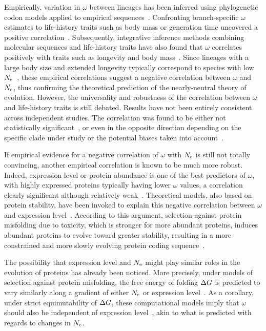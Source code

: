 Empirically, variation in $\omega$ between lineages has been inferred using phylogenetic {codon} models applied to empirical sequences~\citep{Yang1998,Zhang2004}.
Confronting branch-specific $\omega$ estimates to life-history traits such as body mass or generation time uncovered a positive correlation~\citep{Popadin2007, Nikolaev2007}.
Subsequently, integrative inference methods combining molecular sequences and life-history traits have also found that $\omega$ correlates positively with traits such as longevity and body mass~\citep{Lartillot2011, Figuet2017}.
Since lineages with a large body size and extended longevity typically correspond to species with low $N_{\text{e}}$~\citep{Romiguier2014}, these empirical correlations suggest a negative correlation between $\omega$ and $N_{\text{e}}$, thus confirming the theoretical prediction of the {nearly-neutral} theory of evolution.
However, the universality and robustness of the correlation between $\omega$ and life-history traits is still debated.
Results have not been entirely consistent across independent studies. The correlation was found to be either not statistically significant~\citep{Lartillot2012}, or even in the opposite direction depending on the specific clade under study or the potential biases taken into account~\citep{Lanfear2010, Nabholz2013, Lanfear2014, Figuet2016}.

If empirical evidence for a negative correlation of $\omega$ with $N_{\text{e}}$ is still not totally convincing, another empirical correlation is known to be much more robust.
Indeed, expression level or protein abundance is one of the best predictors of $\omega$, with highly expressed proteins typically having lower $\omega$ values, a correlation clearly significant although relatively weak~\citep{Duret2000, Rocha2004, Drummond2005a, Zhang2015, Song2017}.
Theoretical models, also based on protein stability, have been invoked to explain this negative correlation between $\omega$ and expression level~\citep{Wilke2006, Drummond2008}.
According to this argument, selection against protein misfolding due to toxicity, which is stronger for more abundant proteins, induces abundant proteins to evolve toward greater stability, resulting in a more constrained and more slowly evolving protein coding sequence~\citep{Serohijos2012}.

The possibility that expression level and $N_{\text{e}}$ might play similar roles in the evolution of proteins has already been noticed.
More precisely, under models of selection against protein misfolding, the free energy of folding $\Delta G$ is predicted to vary similarly along a gradient of either $N_{\text{e}}$ or expression level~\citep{Serohijos2013}.
As a corollary, under strict equimutability of $\Delta G$, these computational models imply that $\omega$ should also be independent of expression level~\citep{Serohijos2012}, akin to what is predicted with regards to changes in $N_{\text{e}}$.

